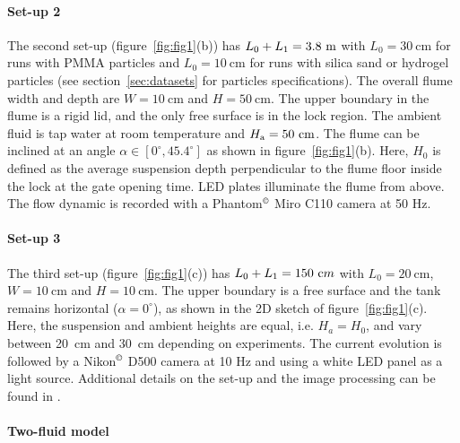 \documentclass[12pt]{article}
\begin{document}
\paragraph{Set-up 2}
The second set-up (figure~\ref{fig:fig1}(b)) has $L_0+L_1=3.8~{\text m}$ with $L_0 = 30~\textrm{cm}$ for runs with PMMA particles and $L_0 = 10~\textrm{cm}$ for runs with silica sand or hydrogel particles (see section~\ref{sec:datasets} for particles specifications). The overall flume width and depth are $W= 10~\textrm{cm}$ and $H= 50~\textrm{cm}$. The upper boundary in the flume is a rigid lid, and the only free surface is in the lock region. The ambient fluid is tap water at room temperature and $H_{\text a}=50~\textrm{cm}$. The flume can be inclined at an angle $\alpha \in [0^\circ,45.4^\circ]$ as shown in figure~\ref{fig:fig1}(b). Here, $H_0$ is defined as the average suspension depth perpendicular to the flume floor inside the lock at the gate opening time. LED plates illuminate the flume from above. The flow dynamic is recorded with a Phantom$^\copyright$ Miro C110 camera at 50 Hz.

\paragraph{Set-up 3}

The third set-up (figure~\ref{fig:fig1}(c)) has $L_0+L_1=150~{\text cm}$ with $L_0 = 20~\textrm{cm}$, $W= 10~\textrm{cm}$ and $H = 10~\textrm{cm}$. The upper boundary is a free surface and the tank remains horizontal ($\alpha = 0^\circ$), as shown in the 2D sketch of figure~\ref{fig:fig1}(c). Here, the suspension and ambient heights are equal, i.e. $H_{a}=H_{0}$, and vary between 20~cm and 30~cm depending on experiments. The current evolution is followed by a Nikon$^\copyright$ D500 camera at 10 Hz and using a white LED panel as a light source. Additional details on the set-up and the image processing can be found in \citet{Schneider2023}.


\paragraph{Two-fluid model}
\end{document}
